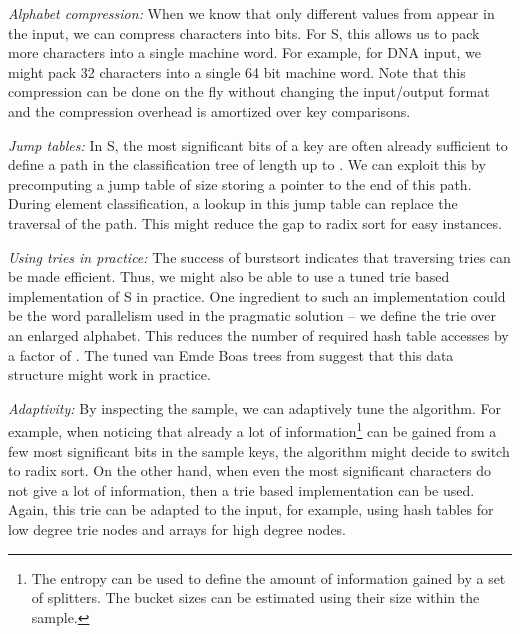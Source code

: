 \documentclass[a4paper]{myjournal}
\begin{document}
\emph{Alphabet compression:} When we know that only  different
values from  appear in the input, we can compress characters into
 bits.  For S, this allows us to pack more characters
into a single machine word.  For example, for DNA input, we might pack 32
characters into a single 64 bit machine word. Note that this compression can be
done on the fly without changing the input/output format and the compression
overhead is amortized over  key comparisons.

\emph{Jump tables:} In S, the  most significant bits of a key are often
already sufficient to define a path in the classification tree of length up to
.  We can exploit this by precomputing a jump table of size  storing a
pointer to the end of this path. During element classification, a lookup in this
jump table can replace the traversal of the path.  This might reduce the gap to
radix sort for easy instances.

\emph{Using tries in practice:} The success of burstsort indicates that
traversing tries can be made efficient. Thus, we might also be able to use a
tuned trie based implementation of S in practice. One ingredient to such an
implementation could be the word parallelism used in the pragmatic solution --
we define the trie over an enlarged alphabet. This reduces the number of
required hash table accesses by a factor of . The tuned van Emde Boas trees
from \cite{dementiev2004sortedlist} suggest that this data structure might work
in practice.

\emph{Adaptivity:} By inspecting the sample, we can adaptively tune the
algorithm.  For example, when noticing that already a lot of information\footnote{The entropy  can be used to
  define the amount of information gained by a set of splitters. The bucket
  sizes  can be estimated using their size within the sample.} can be
gained from a few most significant bits in the sample keys, the algorithm might
decide to switch to radix sort. On the other hand, when even the  most
significant characters do not give a lot of information, then a trie based
implementation can be used.  Again, this trie can be adapted to the input, for
example, using hash tables for low degree trie nodes and arrays for high degree
nodes.



\small


\end{document}
